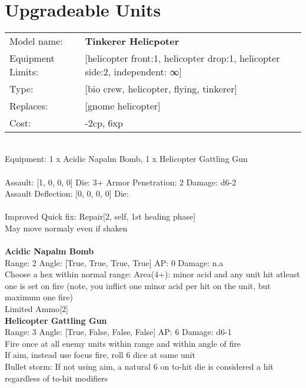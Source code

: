  
\ \\













\section{Upgradeable Units}\noindent
\begin{tabular}{ll}
Model name: &{\bf Tinkerer Helicpoter } \\
Equipment Limits: &[helicopter front:1, helicopter drop:1, helicopter side:2, independent: ∞] \\
Type: &[bio crew, helicopter, flying, tinkerer] \\
Replaces: &[gnome helicopter] \\
Cost: & -2cp, 6xp\\
\end{tabular}
\ \\
Equipment: 1 x Acidic Napalm Bomb, 1 x Helicopter Gattling Gun \\
\ \\
Assault: [1, 0, 0, 0] Die: 3+ Armor Penetration: 2 Damage: d6-2 \\
Assault Deflection: [0, 0, 0, 0] Die: \\
\indent  
\ \\
Improved Quick fix: Repair[2, self, 1st healing phase]\\ 
May move normaly even if shaken\\ 

\ \\
{\bf Acidic Napalm Bomb } \\



Range: 2  Angle: [True, True, True, True] AP: 0 Damage: n.a \\
Choose a hex within normal range: Area(4+): minor acid and any unit hit atleast one is set on fire (note, you inflict one minor acid per hit on the unit, but maximum one fire)\\ 
Limited Ammo[2]\\ 




{\bf Helicopter Gattling Gun } \\



Range: 3  Angle: [True, False, False, False] AP: 6 Damage: d6-1 \\
Fire once at all enemy units within range and within angle of fire\\ 
If aim, instead use focus fire, roll 6 dice at same unit\\ 
Bullet storm: If not using aim, a natural 6 on to-hit die is considered a hit regardless of to-hit modifiers\\ 




